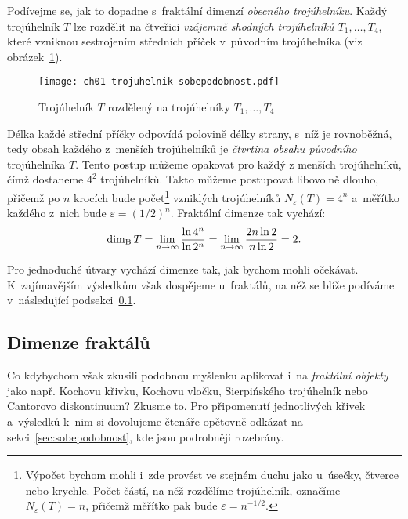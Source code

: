 \begin{example}\label{ex:fraktalni-dimenze-trojuhelnik}
    Podívejme se, jak to dopadne s~fraktální dimenzí \emph{obecného trojúhelníku}. Každý trojúhelník $T$ lze rozdělit na čtveřici \emph{vzájemně shodných trojúhelníků $T_1,\dots,T_4$}, které vzniknou sestrojením středních příček v~původním trojúhelníka (viz obrázek~\ref{fig:trojuhelnik-sobepodobnost}).
    \begin{figure}[h]
        \centering
        \texttt{[image: ch01-trojuhelnik-sobepodobnost.pdf]}
        \caption{Trojúhelník $T$ rozdělený na trojúhelníky $T_1,\dots,T_4$}
        \label{fig:trojuhelnik-sobepodobnost}
    \end{figure}
    Délka každé střední příčky odpovídá polovině délky strany, s~níž je rovnoběžná, tedy obsah každého z~menších trojúhelníků je \emph{čtvrtina obsahu původního} trojúhelníka $T$. Tento postup můžeme opakovat pro každý z menších trojúhelníků, čímž dostaneme $4^2$ trojúhelníků. Takto můžeme postupovat libovolně dlouho, přičemž po $n$ krocích bude počet\footnote{Výpočet bychom mohli i~zde provést ve stejném duchu jako u~úsečky, čtverce nebo krychle. Počet částí, na něž rozdělíme trojúhelník, označíme $N_\varepsilon(T)=n$, přičemž měřítko pak bude $\varepsilon=n^{-1/2}$.} vzniklých trojúhelníků $N_\varepsilon(T)=4^n$ a~měřítko každého z~nich bude $\varepsilon=(1/2)^n$. Fraktální dimenze tak vychází:
    \[\operatorname{dim_B}{T}=\lim_{n\to\infty}{\dfrac{\ln{4^n}}{\ln{2^n}}}=\lim_{n\to\infty}{\dfrac{2n\ln{2}}{n\ln{2}}}=2.\]
\end{example}
Pro jednoduché útvary vychází dimenze tak, jak bychom mohli očekávat. K~zajímavějším výsledkům však dospějeme u~fraktálů, na něž se blíže podíváme v~následující podsekci~\ref{subsec:dimenze-fraktalu}.

\subsection{Dimenze fraktálů}\label{subsec:dimenze-fraktalu}

Co kdybychom však zkusili podobnou myšlenku aplikovat i~na \emph{fraktální objekty} jako např. Kochovu křivku, Kochovu vločku, Sierpińského trojúhelník nebo Cantorovo diskontinuum? Zkusme to. Pro připomenutí jednotlivých křivek a~výsledků k~nim si dovolujeme čtenáře opětovně odkázat na sekci~\ref{sec:sobepodobnost}, kde jsou podrobněji rozebrány.

